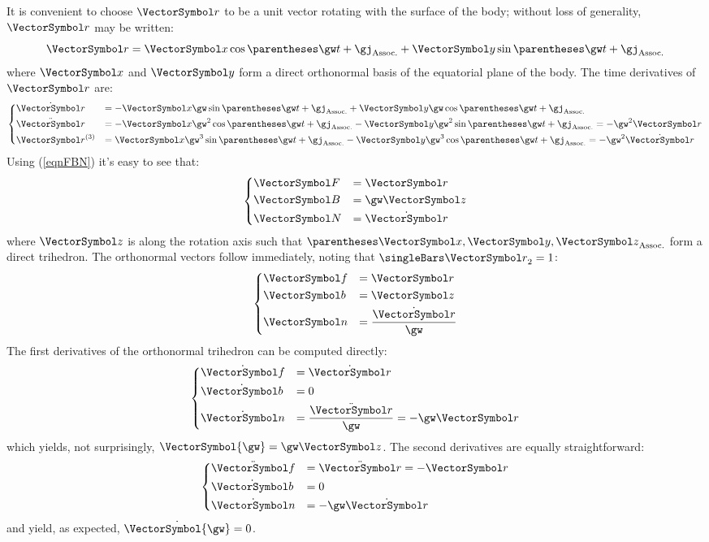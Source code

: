 \documentclass[10pt, a4paper, twoside]{basestyle}
\begin{document}
It is convenient to choose $\vr$ to be a unit vector rotating with the surface of the body; without loss of generality, $\vr$ may be written:
\[
\vr = \vx \cos \pa{\gw t + \gj} + \vy \sin \pa{\gw t + \gj}
\]
where $\vx$ and $\vy$ form a direct orthonormal basis of the equatorial plane of the body.  The time derivatives of $\vr$ are:
\[
\begin{dcases}
\dot{\vr} &= -\vx \gw \sin \pa{\gw t + \gj} + \vy \gw \cos \pa{\gw t + \gj} \\
\ddot{\vr} &= -\vx \gw^2 \cos \pa{\gw t + \gj} - \vy \gw^2 \sin \pa{\gw t + \gj} = -\gw^2 \vr \\
\vr^{(3)} &= \vx \gw^3 \sin \pa{\gw t + \gj} - \vy \gw^3 \cos \pa{\gw t + \gj} = -\gw^2 \dot{\vr}
\end{dcases}
\]
Using (\ref{eqnFBN}) it's easy to see that:
\[
\begin{dcases}
\vF &= \vr \\
\vB &= \gw \vz \\
\vN &= \dot{\vr}
\end{dcases}
\]
where $\vz$ is along the rotation axis such that $\pa{\vx, \vy, \vz}$ form a direct trihedron.  The orthonormal vectors follow immediately, noting that $\norm\vr = 1$:
\[
\begin{dcases}
\vf &= \vr \\
\vb &= \vz \\
\vn &= \frac{\dot{\vr}}{\gw}
\end{dcases}
\]
The first derivatives of the orthonormal trihedron can be computed directly:
\[
\begin{dcases}
\dot{\vf} &= \dot{\vr} \\
\dot{\vb} &= 0 \\
\dot{\vn} &= \frac{\ddot{\vr}}{\gw} = -\gw \vr
\end{dcases}
\]
which yields, not surprisingly, $\VectorSymbol{\gw} = \gw \vz$.  The second derivatives are equally straightforward:
\[
\begin{dcases}
\ddot{\vf} &= \ddot{\vr} = -\vr \\
\dot{\vb} &= 0 \\
\dot{\vn} &= -\gw \dot{\vr}
\end{dcases}
\]
and yield, as expected, $\dot{\VectorSymbol{\gw}} = 0$.
\end{document}
